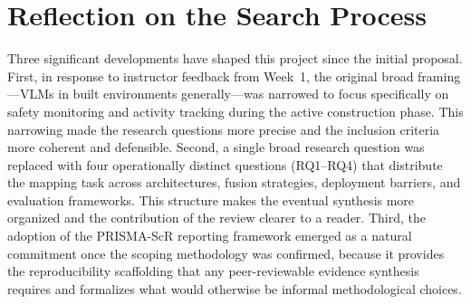 \documentclass[11pt, letterpaper]{article}
\begin{document}
\section{Reflection on the Search Process}

Three significant developments have shaped this project since the initial
proposal. First, in response to instructor feedback from Week~1, the original
broad framing---VLMs in built environments generally---was narrowed to focus
specifically on safety monitoring and activity tracking during the active
construction phase. This narrowing made the research questions more precise
and the inclusion criteria more coherent and defensible. Second, a single
broad research question was replaced with four operationally distinct questions
(RQ1--RQ4) that distribute the mapping task across architectures, fusion
strategies, deployment barriers, and evaluation frameworks. This structure
makes the eventual synthesis more organized and the contribution of the review
clearer to a reader. Third, the adoption of the PRISMA-ScR reporting framework
emerged as a natural commitment once the scoping methodology was confirmed,
because it provides the reproducibility scaffolding that any peer-reviewable
evidence synthesis requires and formalizes what would otherwise be informal
methodological choices.

\end{document}
